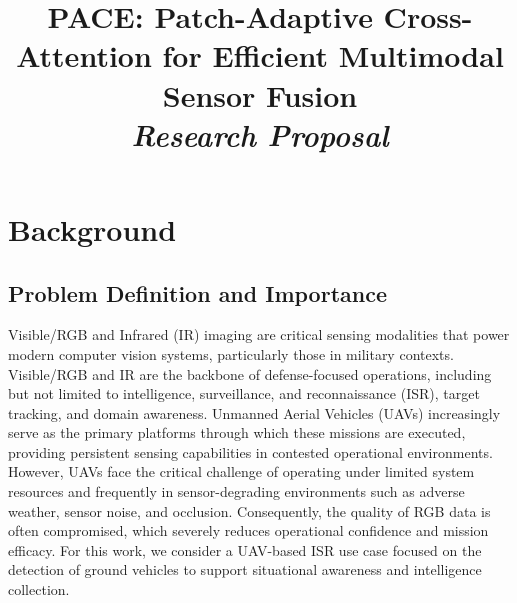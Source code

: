 \documentclass[conference]{IEEEtran}
\begin{document}
\pagestyle{plain}


\title{
    PACE: Patch-Adaptive Cross-Attention for Efficient Multimodal Sensor Fusion
    \\
    \vspace{0.5em} \large \emph{Research Proposal}
}

\author{
}

\maketitle

\color{black}
\section{Background}
\color{black}

\subsection{Problem Definition and Importance}
Visible/RGB and Infrared (IR) imaging are critical sensing modalities that power modern computer vision systems, particularly those in military contexts. Visible/RGB and IR are the backbone of defense-focused operations, including but not limited to intelligence, surveillance, and reconnaissance (ISR), target tracking, and domain awareness. Unmanned Aerial Vehicles (UAVs) increasingly serve as the primary platforms through which these missions are executed, providing persistent sensing capabilities in contested operational environments. However, UAVs face the critical challenge of operating under limited system resources and frequently in sensor-degrading environments such as adverse weather, sensor noise, and occlusion. Consequently, the quality of RGB data is often compromised, which severely reduces operational confidence and mission efficacy. For this work, we consider a UAV-based ISR use case focused on the detection of ground vehicles to support situational awareness and intelligence collection.
\end{document}
